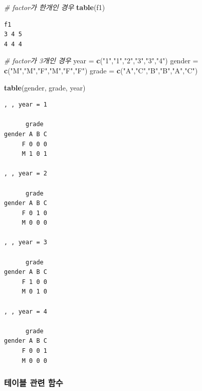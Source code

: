 \documentclass[
  11pt,
]{krantz}
\newenvironment{Shaded}{\begin{snugshade}}{\end{snugshade}}
\newcommand{\CommentTok}[1]{\textcolor[rgb]{0.37,0.37,0.37}{\textit{#1}}}
\newcommand{\KeywordTok}[1]{\textcolor[rgb]{0.27,0.27,0.27}{\textbf{#1}}}
\newcommand{\NormalTok}[1]{#1}
\newcommand{\StringTok}[1]{\textcolor[rgb]{0.5,0.5,0.5}{#1}}
\begin{document}
\begin{Shaded}
\begin{Highlighting}[]
\CommentTok{# factor가 한개인 경우}
\KeywordTok{table}\NormalTok{(f1)}
\end{Highlighting}
\end{Shaded}

\begin{verbatim}
f1
3 4 5 
4 4 4 
\end{verbatim}

\begin{Shaded}
\begin{Highlighting}[]
\CommentTok{# factor가 3개인 경우}
\NormalTok{year =}\StringTok{ }\KeywordTok{c}\NormalTok{(}\StringTok{"1"}\NormalTok{,}\StringTok{"1"}\NormalTok{,}\StringTok{"2"}\NormalTok{,}\StringTok{"3"}\NormalTok{,}\StringTok{"3"}\NormalTok{,}\StringTok{"4"}\NormalTok{)}
\NormalTok{gender =}\StringTok{ }\KeywordTok{c}\NormalTok{(}\StringTok{"M"}\NormalTok{,}\StringTok{"M"}\NormalTok{,}\StringTok{"F"}\NormalTok{,}\StringTok{"M"}\NormalTok{,}\StringTok{"F"}\NormalTok{,}\StringTok{"F"}\NormalTok{)}
\NormalTok{grade =}\StringTok{ }\KeywordTok{c}\NormalTok{(}\StringTok{"A"}\NormalTok{,}\StringTok{"C"}\NormalTok{,}\StringTok{"B"}\NormalTok{,}\StringTok{"B"}\NormalTok{,}\StringTok{"A"}\NormalTok{,}\StringTok{"C"}\NormalTok{)}

\KeywordTok{table}\NormalTok{(gender, grade, year)}
\end{Highlighting}
\end{Shaded}

\begin{verbatim}
, , year = 1

      grade
gender A B C
     F 0 0 0
     M 1 0 1

, , year = 2

      grade
gender A B C
     F 0 1 0
     M 0 0 0

, , year = 3

      grade
gender A B C
     F 1 0 0
     M 0 1 0

, , year = 4

      grade
gender A B C
     F 0 0 1
     M 0 0 0
\end{verbatim}

\normalsize

\hypertarget{tab-related-fun}{%
\subsubsection*{테이블 관련 함수}\label{tab-related-fun}}
\end{document}
